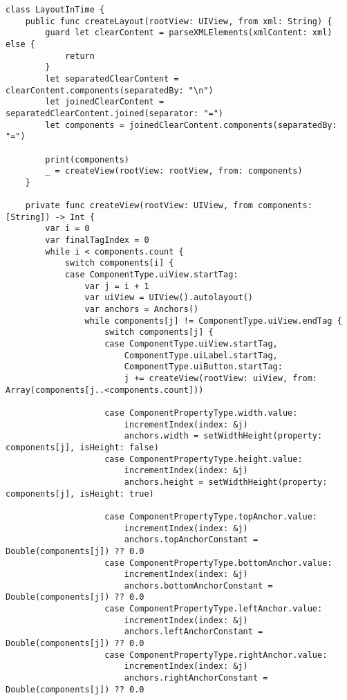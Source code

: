 \begin{lstlisting}[caption={Функция определения списка событий, по свершению которых происходит перезагрузка}]
class LayoutInTime {
    public func createLayout(rootView: UIView, from xml: String) {
        guard let clearContent = parseXMLElements(xmlContent: xml) else {
            return
        }
        let separatedClearContent = clearContent.components(separatedBy: "\n")
        let joinedClearContent = separatedClearContent.joined(separator: "=")
        let components = joinedClearContent.components(separatedBy: "=")

        print(components)
        _ = createView(rootView: rootView, from: components)
    }

    private func createView(rootView: UIView, from components: [String]) -> Int {
        var i = 0
        var finalTagIndex = 0
        while i < components.count {
            switch components[i] {
            case ComponentType.uiView.startTag:
                var j = i + 1
                var uiView = UIView().autolayout()
                var anchors = Anchors()
                while components[j] != ComponentType.uiView.endTag {
                    switch components[j] {
                    case ComponentType.uiView.startTag,
                        ComponentType.uiLabel.startTag,
                        ComponentType.uiButton.startTag:
                        j += createView(rootView: uiView, from: Array(components[j..<components.count]))

                    case ComponentPropertyType.width.value:
                        incrementIndex(index: &j)
                        anchors.width = setWidthHeight(property: components[j], isHeight: false)
                    case ComponentPropertyType.height.value:
                        incrementIndex(index: &j)
                        anchors.height = setWidthHeight(property: components[j], isHeight: true)

                    case ComponentPropertyType.topAnchor.value:
                        incrementIndex(index: &j)
                        anchors.topAnchorConstant = Double(components[j]) ?? 0.0
                    case ComponentPropertyType.bottomAnchor.value:
                        incrementIndex(index: &j)
                        anchors.bottomAnchorConstant = Double(components[j]) ?? 0.0
                    case ComponentPropertyType.leftAnchor.value:
                        incrementIndex(index: &j)
                        anchors.leftAnchorConstant = Double(components[j]) ?? 0.0
                    case ComponentPropertyType.rightAnchor.value:
                        incrementIndex(index: &j)
                        anchors.rightAnchorConstant = Double(components[j]) ?? 0.0


\end{lstlisting}
